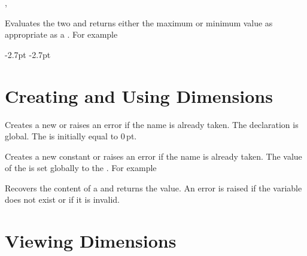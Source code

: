 \documentclass[oneside]{book}
\begin{document}
\begin{function}{\dimMathMax,\dimMathMin}
\begin{syntax}
  
  
\end{syntax}
Evaluates the two  and returns either the
maximum or minimum value as appropriate as a .
For example
\begin{demohigh}
\dimMathMax {3.5pt} {-2.7pt}
\dimMathMin {3.5pt} {-2.7pt}
\end{demohigh}
\end{function}

\section{Creating and Using Dimensions}

\begin{function}{\dimNew}
\begin{syntax}
 
\end{syntax}
Creates a new  or raises an error if the name is
already taken. The declaration is global. The 
is initially equal to $0$\,pt.
\end{function}

\begin{function}{\dimConst}
\begin{syntax}
  
\end{syntax}
Creates a new constant  or raises an error if the
name is already taken. The value of the  is set
globally to the . For example
\begin{demohigh}
\dimConst \cFooSomeDim {1cm}
\dimUse \cFooSomeDim
\end{demohigh}
\end{function}

\begin{function}{\dimUse}
\begin{syntax}
 
\end{syntax}
Recovers the content of a  and returns the value.
An error is raised if the variable does not exist or if it is invalid.
\end{function}

\section{Viewing Dimensions}
\end{document}
